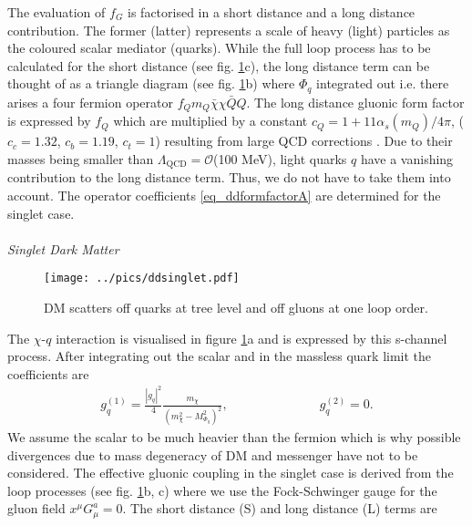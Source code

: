 \noindent The evaluation of $f_G$ is factorised in a short distance and a long distance 
contribution. The former (latter) represents a scale of heavy (light) particles as the coloured scalar mediator (quarks). 
While the full loop process has to be calculated for the short distance (see fig. \ref{pic_ddsinglet}c), the long distance term can be thought of
as a triangle diagram (see fig. \ref{pic_ddsinglet}b) where $\Phi_q$ integrated 
out i.e. there arises a four fermion operator $f_Q m_Q \bar \chi \chi\bar Q Q$. The long distance gluonic form factor is expressed by $f_Q$ 
which are multiplied by a constant 
$c_Q = 1+11\alpha_s(m_Q)/4\pi$, ($c_c=1.32$, $c_b = 1.19$, $c_t = 1$)
resulting from large QCD corrections \cite{Djouadi}.
Due to their masses being smaller than $\Lambda_\text{QCD} = \mathcal{O}$(100 MeV), light quarks $q$ have a vanishing contribution to the long
distance term. Thus, we do not have to take them into account. The operator coefficients \eqref{eq_ddformfactorA} are determined for the 
singlet case.
\\ \\ \textit{Singlet Dark Matter}\\
\begin{figure}[t]
 \texttt{[image: ../pics/ddsinglet.pdf]}
 \caption{DM scatters off quarks at tree level and off gluons at one loop order.}
 \label{pic_ddsinglet}
\end{figure}
\noindent The $\chi$-$q$ interaction is visualised in figure \ref{pic_ddsinglet}a and is expressed by this s-channel process. After integrating out 
the scalar and in the massless quark limit the coefficients are
\begin{align}
 g_q^{(1)} = \frac{|g_q|^2 }{4} \frac{m_\chi}{\left(m_\chi^2 - M_{\Phi_q}^2\right)^2},\hspace{3cm} g_q^{(2)} = 0.
\end{align}
We assume the scalar to be much heavier than the fermion which is why possible divergences due to mass degeneracy of DM and messenger have not
to be considered. 
The effective gluonic coupling in the 
singlet case is derived from the loop processes (see fig. \ref{pic_ddsinglet}b, c) 
where we use the Fock-Schwinger gauge for the gluon
field $x^\mu G^a_\mu = 0$. The short distance (S) and long distance (L) terms are

